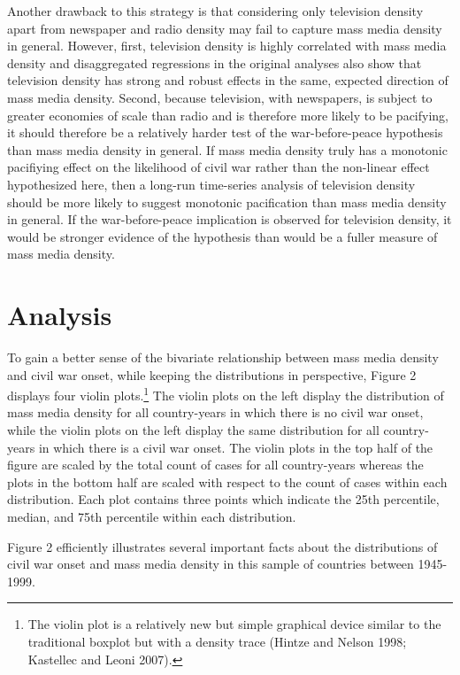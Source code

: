 \documentclass[11pt,article,oneside]{memoir}
\begin{document}
Another drawback to this strategy is that considering only television
density apart from newspaper and radio density may fail to capture mass
media density in general. However, first, television density is highly
correlated with mass media density and disaggregated regressions in the
original analyses also show that television density has strong and
robust effects in the same, expected direction of mass media density.
Second, because television, with newspapers, is subject to greater
economies of scale than radio and is therefore more likely to be
pacifying, it should therefore be a relatively harder test of the
war-before-peace hypothesis than mass media density in general. If mass
media density truly has a monotonic pacifiying effect on the likelihood
of civil war rather than the non-linear effect hypothesized here, then a
long-run time-series analysis of television density should be more
likely to suggest monotonic pacification than mass media density in
general. If the war-before-peace implication is observed for television
density, it would be stronger evidence of the hypothesis than would be a
fuller measure of mass media density.

\section{Analysis}\label{analysis}

To gain a better sense of the bivariate relationship between mass media
density and civil war onset, while keeping the distributions in
perspective, Figure 2 displays four violin plots.\footnote{The violin
  plot is a relatively new but simple graphical device similar to the
  traditional boxplot but with a density trace (Hintze and Nelson 1998;
  Kastellec and Leoni 2007).} The violin plots on the left display the
distribution of mass media density for all country-years in which there
is no civil war onset, while the violin plots on the left display the
same distribution for all country-years in which there is a civil war
onset. The violin plots in the top half of the figure are scaled by the
total count of cases for all country-years whereas the plots in the
bottom half are scaled with respect to the count of cases within each
distribution. Each plot contains three points which indicate the 25th
percentile, median, and 75th percentile within each distribution.

Figure 2 efficiently illustrates several important facts about the
distributions of civil war onset and mass media density in this sample
of countries between 1945-1999.
\end{document}
